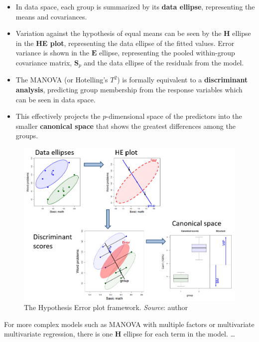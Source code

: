 \documentclass[
  letterpaper,
  10pt,
  krantz2]{krantz}
\begin{document}
\begin{itemize}
\item
  In data space, each group is summarized by its \textbf{data ellipse},
  representing the means and covariances.
\item
  Variation against the hypothesis of equal means can be seen by the
  \(\mathbf{H}\) ellipse in the \textbf{HE plot}, representing the data
  ellipse of the fitted values. Error variance is shown in the
  \(\mathbf{E}\) ellipse, representing the pooled within-group
  covariance matrix, \(\mathbf{S}_p\) and the data ellipse of the
  residuals from the model.
\item
  The MANOVA (or Hotelling's \(T^2\)) is formally equivalent to a
  \textbf{discriminant analysis}, predicting group membership from the
  response variables which can be seen in data space.
\item
  This effectively projects the \(p\)-dimensional space of the
  predictors into the smaller \textbf{canonical space} that shows the
  greatest differences among the groups.
\end{itemize}

\begin{figure}

{\centering \includegraphics[width=1\textwidth,height=\textheight]{images/HE-framework.png}

}

\caption{\label{fig-HE-framework}The Hypothesis Error plot framework.
\emph{Source}: author}

\end{figure}

For more complex models such as MANOVA with multiple factors or
multivariate multivariate regression, there is one \(\mathbf{H}\)
ellipse for each term in the model. \ldots{}
\end{document}
